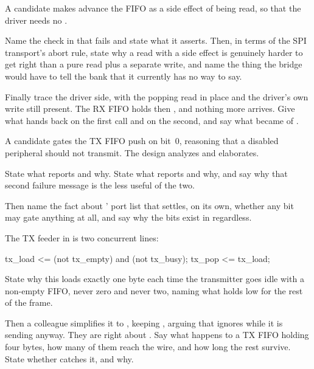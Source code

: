  A candidate makes  advance the FIFO as a side effect of being read, so that
the driver needs no .

Name the check in  that fails and state what it asserts. Then, in terms of the SPI
transport's abort rule, state why a read with a side effect is genuinely harder to get right than a
pure read plus a separate write, and name the thing the bridge would have to tell the bank that it
currently has no way to say.

Finally trace the driver side, with the popping read in place and the driver's own 
write still present. The RX FIFO holds  then , and nothing more arrives. Give
what  hands back on the first call and on the second, and say what became of
. 

 A candidate gates the TX FIFO push on  bit~0, reasoning that a disabled
peripheral should not transmit. The design analyzes and elaborates.

State what  reports and why. State what  reports and why, and
say why that second failure message is the less useful of the two.

Then name the fact about ' port list that settles, on its own, whether any
 bit may gate anything at all, and say why the bits exist in  regardless.

 The TX feeder in  is two concurrent lines:

\begin{vhdlcode}
tx_load <= (not tx_empty) and (not tx_busy);
tx_pop  <= tx_load;
\end{vhdlcode}

\noindent State why this loads exactly one byte each time the transmitter goes idle with a non-empty
FIFO, never zero and never two, naming what holds  low for the rest of the frame.

Then a colleague simplifies it to , keeping ,
arguing that  ignores  while it is sending anyway. They are right about
. Say what happens to a TX FIFO holding four bytes, how many of them reach the wire, and
how long the rest survive. State whether  catches it, and why. 

\label{exa:q:5}

